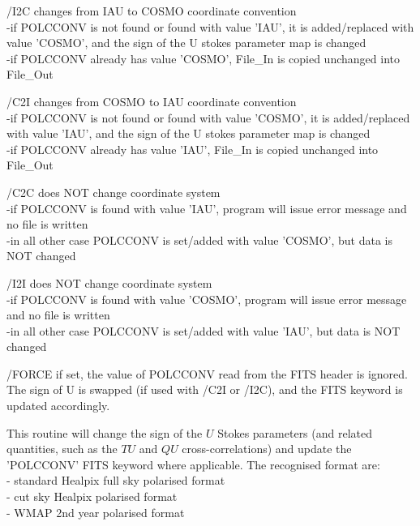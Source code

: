 \begin{keywords}
  \begin{kwlist}{} %
        \item[{/I2C}] changes from IAU to COSMO coordinate convention \\
            -if POLCCONV is not found or found with value 'IAU', it is
             added/replaced with value 'COSMO', and the sign of the U stokes
             parameter map is changed \\
            -if POLCCONV already has value 'COSMO', File\_In is copied
            unchanged into File\_Out

        \item[{/C2I}] changes from COSMO to IAU coordinate convention \\
            -if POLCCONV is not found or found with value 'COSMO', it is
             added/replaced with value 'IAU', and the sign of the U stokes
             parameter map is changed \\
            -if POLCCONV already has value 'IAU',  File\_In is copied
            unchanged into File\_Out

        \item[{/C2C}] does NOT change coordinate system \\
            -if POLCCONV is found with value 'IAU', program will issue error
            message and no file is written \\
            -in all other case POLCCONV is set/added with value 'COSMO', but
             data is NOT changed

        \item[{/I2I}] does NOT change coordinate system \\
            -if POLCCONV is found with value 'COSMO', program will issue error
            message and no file is written \\
            -in all other case POLCCONV is set/added with value 'IAU', but
             data is NOT changed

        \item[{/FORCE}] if set, the value of POLCCONV read from the FITS header is
          ignored.
              The sign of U is swapped (if used with /C2I or /I2C), and the
              FITS keyword is updated accordingly.

   \end{kwlist}
\end{keywords}

\begin{codedescription}
{This routine will change the sign of the $U$ Stokes parameters (and related
quantities, such as the $TU$ and $QU$ cross-correlations) and update the
'POLCCONV' FITS keyword where applicable.
The recognised format are: \\
- standard Healpix  full sky polarised format \\
- cut sky Healpix polarised format \\
- WMAP 2nd year polarised format}
\end{codedescription}



